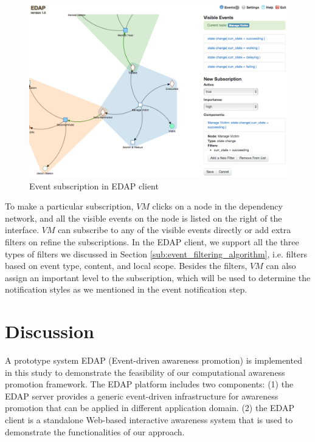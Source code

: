 \begin{figure}[htbp] %
	\centering
	\includegraphics[width=5.8in]{vm_interface_subscription.jpg} 
	\caption{Event subscription in EDAP client}
	\label{fig:vm_interface_subscription}
\end{figure}

To make a particular subscription, $VM$ clicks on a node in the dependency network, and all the visible events on the node is listed on the right of the interface. $VM$ can subscribe to any of the visible events directly or add extra filters on refine the subscriptions. In the EDAP client, we support all the three types of filters we discussed in Section \ref{sub:event_filtering_algorithm}, i.e. filters based on event type, content, and local scope. Besides the filters, $VM$ can also assign an important level to the subscription, which will be used to determine the notification styles as we mentioned in the event notification step.
\section{Discussion} %
\label{sec:discussion}
A prototype system EDAP (Event-driven awareness promotion) is implemented in this study to demonstrate the feasibility of our computational awareness promotion framework. The EDAP platform includes two components: (1) the EDAP server provides a generic event-driven infrastructure for awareness promotion that can be applied in different application domain. (2) the EDAP client is a standalone Web-based interactive awareness system that is used to demonstrate the functionalities of our approach.

